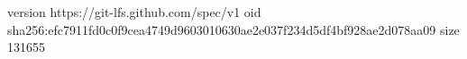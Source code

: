 version https://git-lfs.github.com/spec/v1
oid sha256:efc7911fd0c0f9cea4749d9603010630ae2e037f234d5df4bf928ae2d078aa09
size 131655
